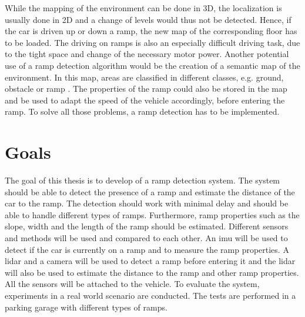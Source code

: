 While the mapping of the environment can be done in 3D, the localization is usually done in 2D and a change of levels would thus not be detected.
Hence, if the car is driven up or down a ramp, the new map of the corresponding floor has to be loaded.
The driving on ramps is also an especially difficult driving task, due to the tight space and change of the necessary motor power.
Another potential use of a ramp detection algorithm would be the creation of a semantic map of the environment.
In this map, areas are classified in different classes, e.g. ground, obstacle or ramp \cite{Sakenas2007}.
The properties of the ramp could also be stored in the map and be used to adapt the speed of the vehicle accordingly, before entering the ramp.
To solve all those problems, a ramp detection has to be implemented.



\section{Goals}
The goal of this thesis is to develop of a ramp detection system.
The system should be able to detect the presence of a ramp and estimate the distance of the car to the ramp.
The detection should work with minimal delay and should be able to handle different types of ramps.
Furthermore, ramp properties such as the slope, width and the length of the ramp should be estimated.
Different sensors and methods will be used and compared to each other.
An \gls{imu} will be used to detect if the car is currently on a ramp and to measure the ramp properties.
A \gls{lidar} and a camera will be used to detect a ramp before entering it and the \gls{lidar} will also be used to estimate the distance to the ramp and other ramp properties.
All the sensors will be attached to the vehicle.
To evaluate the system, experiments in a real world scenario are conducted.
The tests are performed in a parking garage with different types of ramps.



